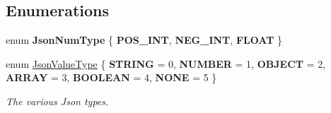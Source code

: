 \subsection*{Enumerations}
\begin{DoxyCompactItemize}
\item 
\mbox{\label{namespacenta_1_1utils_a83ee7c4cfccd9fa43564f5fe1c0c77d3}} 
enum {\bfseries Json\+Num\+Type} \{ {\bfseries P\+O\+S\+\_\+\+I\+NT}, 
{\bfseries N\+E\+G\+\_\+\+I\+NT}, 
{\bfseries F\+L\+O\+AT}
 \}
\item 
\mbox{\label{namespacenta_1_1utils_ac9921c0a3baf86d9facdc4927c66def3}} 
enum \hyperlink{namespacenta_1_1utils_ac9921c0a3baf86d9facdc4927c66def3}{Json\+Value\+Type} \{ \newline
{\bfseries S\+T\+R\+I\+NG} = 0, 
{\bfseries N\+U\+M\+B\+ER} = 1, 
{\bfseries O\+B\+J\+E\+CT} = 2, 
{\bfseries A\+R\+R\+AY} = 3, 
\newline
{\bfseries B\+O\+O\+L\+E\+AN} = 4, 
{\bfseries N\+O\+NE} = 5
 \}\begin{DoxyCompactList}\small\item\em The various Json types. \end{DoxyCompactList}
\end{DoxyCompactItemize}
